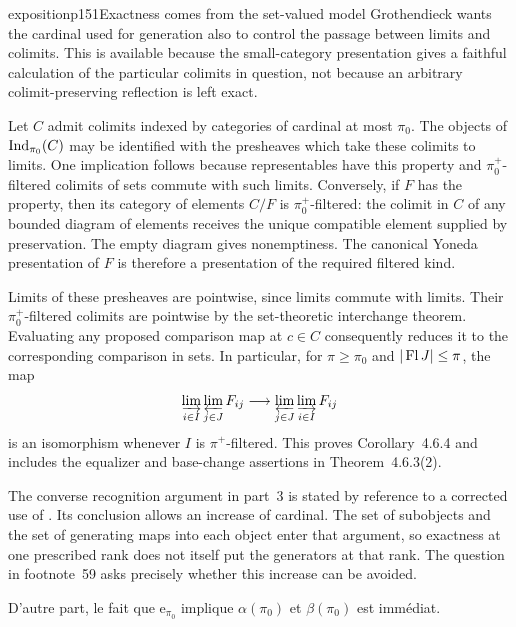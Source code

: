 \begin{dcomment}{exposition}{p151}{Exactness comes from the set-valued model}
Grothendieck wants the cardinal used for generation also to control the passage between limits and colimits. This is available because the small-category presentation gives a faithful calculation of the particular colimits in question, not because an arbitrary colimit-preserving reflection is left exact.

Let $C$ admit colimits indexed by categories of cardinal at most $\pi_0$. The objects of $\operatorname{Ind}_{\pi_0}(C)$ may be identified with the presheaves which take these colimits to limits. One implication follows because representables have this property and $\pi_0^+$-filtered colimits of sets commute with such limits. Conversely, if $F$ has the property, then its category of elements $C/F$ is $\pi_0^+$-filtered: the colimit in $C$ of any bounded diagram of elements receives the unique compatible element supplied by preservation. The empty diagram gives nonemptiness. The canonical Yoneda presentation of $F$ is therefore a presentation of the required filtered kind.

Limits of these presheaves are pointwise, since limits commute with limits. Their $\pi_0^+$-filtered colimits are pointwise by the set-theoretic interchange theorem. Evaluating any proposed comparison map at $c\in C$ consequently reduces it to the corresponding comparison in sets. In particular, for $\pi\geq\pi_0$ and $|\operatorname{Fl} J|\leq\pi$, the map
\[
 \varinjlim_{i\in I}\varprojlim_{j\in J}F_{ij}
 \longrightarrow
 \varprojlim_{j\in J}\varinjlim_{i\in I}F_{ij}
\]
is an isomorphism whenever $I$ is $\pi^+$-filtered. This proves Corollary~4.6.4 and includes the equalizer and base-change assertions in Theorem~4.6.3(2).

The converse recognition argument in part~3 is stated by reference to a corrected use of \citet[Expos\'e~I, Proposition~9.11]{SGA4I1972}. Its conclusion allows an increase of cardinal. The set of subobjects and the set of generating maps into each object enter that argument, so exactness at one prescribed rank does not itself put the generators at that rank. The question in footnote~59 asks precisely whether this increase can be avoided.
\end{dcomment}


D'autre part, le fait que $\mathrm{e}_{\pi_0}$ implique $\alpha(\pi_0)$ et $\beta(\pi_0)$ est immédiat.

